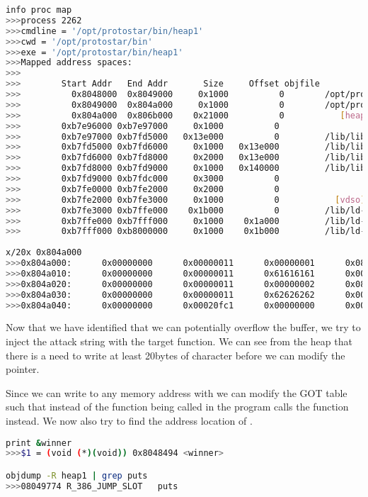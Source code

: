 \begin{lstlisting}[language=bash]
info proc map
>>>process 2262
>>>cmdline = '/opt/protostar/bin/heap1'
>>>cwd = '/opt/protostar/bin'
>>>exe = '/opt/protostar/bin/heap1'
>>>Mapped address spaces:
>>>
>>>        Start Addr   End Addr       Size     Offset objfile
>>>          0x8048000  0x8049000     0x1000          0        /opt/protostar/bin/heap1
>>>          0x8049000  0x804a000     0x1000          0        /opt/protostar/bin/heap1
>>>          0x804a000  0x806b000    0x21000          0           [heap]
>>>        0xb7e96000 0xb7e97000     0x1000          0
>>>        0xb7e97000 0xb7fd5000   0x13e000          0         /lib/libc-2.11.2.so
>>>        0xb7fd5000 0xb7fd6000     0x1000   0x13e000         /lib/libc-2.11.2.so
>>>        0xb7fd6000 0xb7fd8000     0x2000   0x13e000         /lib/libc-2.11.2.so
>>>        0xb7fd8000 0xb7fd9000     0x1000   0x140000         /lib/libc-2.11.2.so
>>>        0xb7fd9000 0xb7fdc000     0x3000          0
>>>        0xb7fe0000 0xb7fe2000     0x2000          0
>>>        0xb7fe2000 0xb7fe3000     0x1000          0           [vdso]
>>>        0xb7fe3000 0xb7ffe000    0x1b000          0         /lib/ld-2.11.2.so
>>>        0xb7ffe000 0xb7fff000     0x1000    0x1a000         /lib/ld-2.11.2.so
>>>        0xb7fff000 0xb8000000     0x1000    0x1b000         /lib/ld-2.11.2.so
  
x/20x 0x804a000
>>>0x804a000:      0x00000000      0x00000011      0x00000001      0x0804a018
>>>0x804a010:      0x00000000      0x00000011      0x61616161      0x00000000
>>>0x804a020:      0x00000000      0x00000011      0x00000002      0x0804a038
>>>0x804a030:      0x00000000      0x00000011      0x62626262      0x00000000
>>>0x804a040:      0x00000000      0x00020fc1      0x00000000      0x00000000
\end{lstlisting}

Now that we have identified that we can potentially overflow the buffer,
we try to inject the attack string with the target function. We
can see from the heap that there is a need to write at least 20bytes of
character before we can modify the pointer.

Since we can write to any memory address with  we can modify the
GOT table such that instead of the  function being called in 
the program calls the  function instead. We now also try to find
the address location of .

\begin{lstlisting}[language=bash]
print &winner
>>>$1 = (void (*)(void)) 0x8048494 <winner>

objdump -R heap1 | grep puts
>>>08049774 R_386_JUMP_SLOT   puts
\end{lstlisting}

